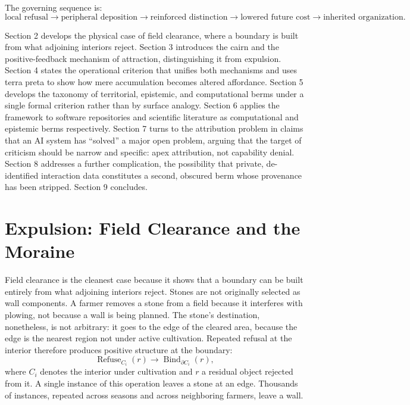 \documentclass[11pt]{article}
\begin{document}
The governing sequence is:
\[
\text{local refusal}
\rightarrow
\text{peripheral deposition}
\rightarrow
\text{reinforced distinction}
\rightarrow
\text{lowered future cost}
\rightarrow
\text{inherited organization}.
\]

Section 2 develops the physical case of field clearance, where a boundary is built from what adjoining interiors reject. Section 3 introduces the cairn and the positive-feedback mechanism of attraction, distinguishing it from expulsion. Section 4 states the operational criterion that unifies both mechanisms and uses terra preta to show how mere accumulation becomes altered affordance. Section 5 develops the taxonomy of territorial, epistemic, and computational berms under a single formal criterion rather than by surface analogy. Section 6 applies the framework to software repositories and scientific literature as computational and epistemic berms respectively. Section 7 turns to the attribution problem in claims that an AI system has ``solved'' a major open problem, arguing that the target of criticism should be narrow and specific: apex attribution, not capability denial. Section 8 addresses a further complication, the possibility that private, de-identified interaction data constitutes a second, obscured berm whose provenance has been stripped. Section 9 concludes.

\section{Expulsion: Field Clearance and the Moraine}

Field clearance is the cleanest case because it shows that a boundary can be built entirely from what adjoining interiors reject. Stones are not originally selected as wall components. A farmer removes a stone from a field because it interferes with plowing, not because a wall is being planned. The stone's destination, nonetheless, is not arbitrary: it goes to the edge of the cleared area, because the edge is the nearest region not under active cultivation. Repeated refusal at the interior therefore produces positive structure at the boundary:
\[
\operatorname{Refuse}_{C_i}(r)
\longrightarrow
\operatorname{Bind}_{\partial C_i}(r),
\]
where $C_i$ denotes the interior under cultivation and $r$ a residual object rejected from it. A single instance of this operation leaves a stone at an edge. Thousands of instances, repeated across seasons and across neighboring farmers, leave a wall.
\end{document}
